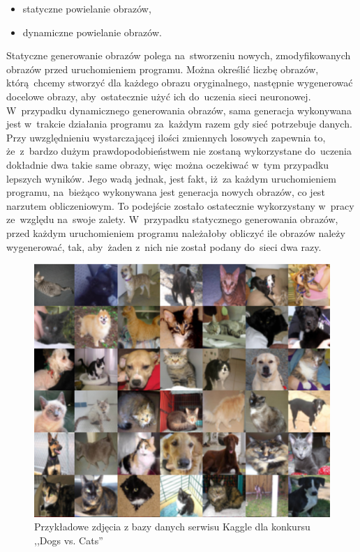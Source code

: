 \begin{itemize}
\item statyczne powielanie obrazów,
\item dynamiczne powielanie obrazów.
\end{itemize}
Statyczne generowanie obrazów polega na~stworzeniu nowych, zmodyfikowanych obrazów przed uruchomieniem programu. Można określić liczbę obrazów, którą~chcemy stworzyć dla każdego obrazu oryginalnego, następnie wygenerować docelowe obrazy, aby~ostatecznie użyć ich do~uczenia sieci neuronowej. W~przypadku dynamicznego generowania obrazów, sama generacja wykonywana jest w~trakcie działania programu za~każdym razem gdy sieć potrzebuje danych. Przy uwzględnieniu wystarczającej ilości zmiennych losowych zapewnia to, że~z~bardzo dużym prawdopodobieństwem nie zostaną wykorzystane do~uczenia dokładnie dwa takie same obrazy, więc można oczekiwać w~tym przypadku lepszych wyników. Jego wadą jednak, jest fakt, iż~za każdym uruchomieniem programu, na~bieżąco wykonywana jest generacja nowych obrazów, co jest narzutem obliczeniowym. To podejście zostało ostatecznie wykorzystany w~pracy ze~względu na~swoje zalety. W~przypadku statycznego generowania obrazów, przed każdym uruchomieniem programu należałoby obliczyć ile obrazów należy wygenerować, tak, aby~żaden z~nich nie został podany do~sieci dwa razy.

\begin{figure}[ht!]
\centering
\includegraphics[scale=0.8]{res/catsdogs.png}
\caption[Caption for LOF]{Przykładowe zdjęcia z bazy danych serwisu Kaggle dla konkursu ,,Dogs vs. Cats'' \label{catsdogs}}
\end{figure} 

